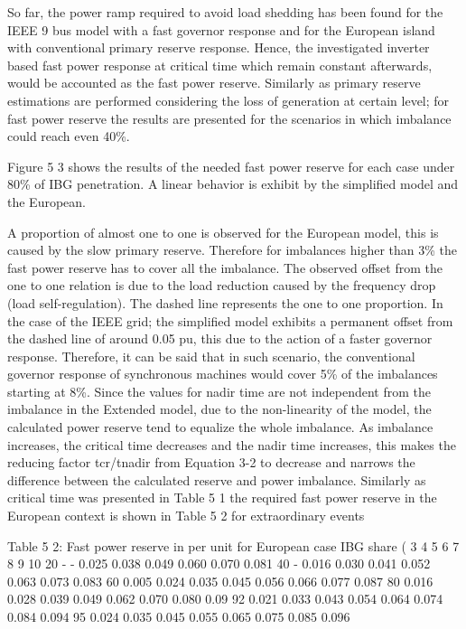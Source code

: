So far, the power ramp required to avoid load shedding has been found for the IEEE 9 bus model with a fast governor response and for the European island with conventional primary reserve response. Hence, the investigated inverter based fast power response at critical time which remain constant afterwards, would be accounted as the fast power reserve. Similarly as primary reserve estimations are performed considering the loss of generation at certain level; for fast power reserve the results are presented for the scenarios in which imbalance could reach even 40\%.   

 Figure 5 3 shows the results of the needed fast power reserve for each case under 80\% of IBG penetration. A linear behavior is exhibit by the simplified model and the European.

A proportion of almost one to one is observed for the European model, this is caused by the slow primary reserve. Therefore for imbalances higher than 3\% the fast power reserve has to cover all the imbalance. The observed offset from the one to one relation is due to the load reduction caused by the frequency drop (load self-regulation). The dashed line represents the one to one proportion. In the case of the IEEE grid; the simplified model exhibits a permanent offset from the dashed line of around 0.05 pu, this due to the action of a faster governor response. Therefore, it can be said that in such scenario, the conventional governor response of synchronous machines would cover 5\% of the imbalances starting at 8\%. Since the values for nadir time are not independent from the imbalance in the Extended model, due to the non-linearity of the model, the calculated power reserve tend to equalize the whole imbalance. As imbalance increases, the critical time decreases and the nadir time increases, this makes the reducing factor tcr/tnadir from Equation 3-2 to decrease and narrows the difference between the calculated reserve and power imbalance.
Similarly as critical time was presented in Table 5 1 the required fast power reserve in the European context is shown in Table 5 2 for extraordinary events 



Table 5 2: Fast power reserve in per unit for European case
IBG share (%
	3	4	5	6	7	8	9	10
20	-	-	0.025	0.038	0.049	0.060	0.070	0.081
40	-	0.016	0.030	0.041	0.052	0.063	0.073	0.083
60	0.005	0.024	0.035	0.045	0.056	0.066	0.077	0.087
80	0.016	0.028	0.039	0.049	0.062	0.070	0.080	0.09
92	0.021	0.033	0.043	0.054	0.064	0.074	0.084	0.094
95	0.024	0.035	0.045	0.055	0.065	0.075	0.085	0.096

